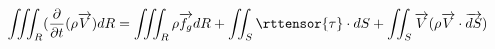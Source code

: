 \begin{equation}
  \iiint_R(\frac{\partial}{\partial{t}}(\rho\overrightarrow{V})dR = \iiint_R\rho\overrightarrow{f_g} dR + 
    \iint_S\rttensor{\tau}\cdot dS + \iint_S \overrightarrow{V}(\rho\overrightarrow{V}\cdot \overrightarrow{dS})
\end{equation}
